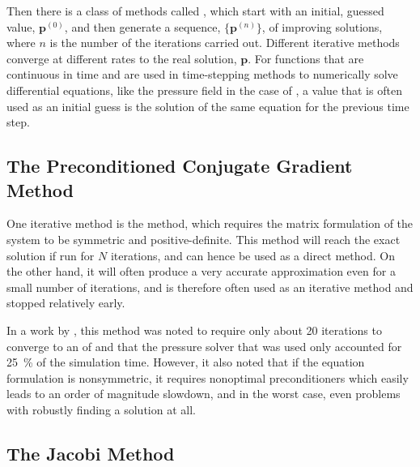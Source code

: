 Then there is a class of methods called , which start with an initial, guessed value, $\mathbf{p}^{(0)}$, and then generate a sequence, $\{\mathbf{p}^{(n)}\}$, of improving \approximate solutions, where $n$ is the number of the iterations carried out. Different iterative methods converge at different rates to the real solution, $\mathbf{p}$. For functions that are continuous in time and are used in time-stepping methods to numerically solve differential equations, like the pressure field in the case of \CFD, a value that is often used as an initial guess is the solution of the same equation for the previous time step.

\subsection{The Preconditioned Conjugate Gradient Method}


One iterative method is the \PCG method, which requires the matrix formulation of the system to be symmetric and positive-definite. This method will reach the exact solution if run for $N$ iterations, and can hence be used as a direct method. On the other hand, it will often produce a very accurate approximation even for a small number of iterations, and is therefore often used as an iterative method and stopped relatively early.

In a work by \citet{Losasso2004}, this method was noted to require only about 20 iterations to converge to an \accuracy of  and that the pressure solver that was used only accounted for \mbox{25 \%} of the simulation time. However, it also noted that if the equation formulation is nonsymmetric, it requires nonoptimal preconditioners which easily leads to an order of magnitude slowdown, and in the worst case, even problems with robustly finding a solution at all.

\subsection{The Jacobi Method}

